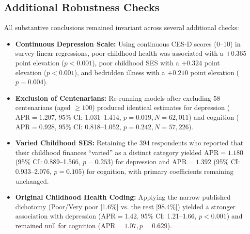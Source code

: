 \subsection{Additional Robustness Checks}
All substantive conclusions remained invariant across several additional checks:
\begin{itemize}
    \item \textbf{Continuous Depression Scale:} Using continuous CES-D scores (0--10) in survey linear regressions, poor childhood health was associated with a $+0.365$ point elevation ($p < 0.001$), poor childhood SES with a $+0.324$ point elevation ($p < 0.001$), and bedridden illness with a $+0.210$ point elevation ($p = 0.004$).
    \item \textbf{Exclusion of Centenarians:} Re-running models after excluding 58 centenarians (aged $\ge 100$) produced identical estimates for depression ($\text{APR} = 1.207$, 95\% CI: 1.031--1.414, $p = 0.019, N = 62{,}011$) and cognition ($\text{APR} = 0.928$, 95\% CI: 0.818--1.052, $p = 0.242, N = 57{,}226$).
    \item \textbf{Varied Childhood SES:} Retaining the 394 respondents who reported that their childhood finances ``varied'' as a distinct category yielded $\text{APR} = 1.180$ (95\% CI: 0.889--1.566, $p = 0.253$) for depression and $\text{APR} = 1.392$ (95\% CI: 0.933--2.076, $p = 0.105$) for cognition, with primary coefficients remaining unchanged.
    \item \textbf{Original Childhood Health Coding:} Applying the narrow published dichotomy (Poor/Very poor [1.6\%] vs. the rest [98.4\%]) yielded a stronger association with depression ($\text{APR} = 1.42$, 95\% CI: 1.21--1.66, $p < 0.001$) and remained null for cognition ($\text{APR} = 1.07, p = 0.629$).
\end{itemize}
